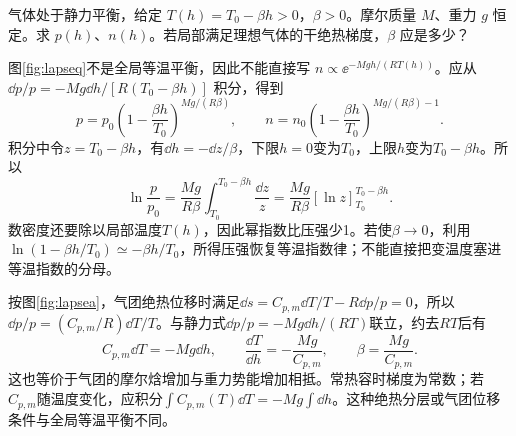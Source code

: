 \begin{exercise}[温度随高度线性下降的大气]
气体处于静力平衡，给定 $T(h)=T_0-\beta h>0$，$\beta>0$。摩尔质量 $M$、重力 $g$ 恒定。求 $p(h)$、$n(h)$。若局部满足理想气体的干绝热梯度，$\beta$ 应是多少？
\end{exercise}
\begin{solution}
图\ref{fig:lapseq}不是全局等温平衡，因此不能直接写 $n\propto\ee^{-Mgh/(RT(h))}$。应从 $\dd p/p=-Mg\dd h/[R(T_0-\beta h)]$ 积分，得到
\[
 p=p_0\left(1-\frac{\beta h}{T_0}\right)^{Mg/(R\beta)},\qquad
 n=n_0\left(1-\frac{\beta h}{T_0}\right)^{Mg/(R\beta)-1}.
\]
积分中令$z=T_0-\beta h$，有$\dd h=-\dd z/\beta$，下限$h=0$变为$T_0$，上限$h$变为$T_0-\beta h$。所以
\[
 \ln\frac p{p_0}=\frac{Mg}{R\beta}
 \int_{T_0}^{T_0-\beta h}\frac{\dd z}{z}
 =\frac{Mg}{R\beta}[\ln z]_{T_0}^{T_0-\beta h}.
\]
数密度还要除以局部温度$T(h)$，因此幂指数比压强少1。若使$\beta\to0$，利用$\ln(1-\beta h/T_0)\simeq-\beta h/T_0$，所得压强恢复等温指数律；不能直接把变温度塞进等温指数的分母。

按图\ref{fig:lapsea}，气团绝热位移时满足$\dd s=C_{p,m}\dd T/T-R\dd p/p=0$，所以$\dd p/p=(C_{p,m}/R)\dd T/T$。与静力式$\dd p/p=-Mg\dd h/(RT)$联立，约去$RT$后有
\[
 C_{p,m}\dd T=-Mg\dd h,\qquad
 \frac{\dd T}{\dd h}=-\frac{Mg}{C_{p,m}},\qquad
 \beta=\frac{Mg}{C_{p,m}}.
\]
这也等价于气团的摩尔焓增加与重力势能增加相抵。常热容时梯度为常数；若$C_{p,m}$随温度变化，应积分$\int C_{p,m}(T)\dd T=-Mg\int\dd h$。这种绝热分层或气团位移条件与全局等温平衡不同。
\end{solution}

